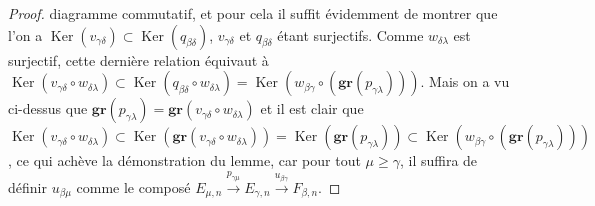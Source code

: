 \begin{proof}
diagramme commutatif, et pour cela il suffit évidemment de montrer que l'on a
$\operatorname{Ker}(v_{\gamma\delta})\subset\operatorname{Ker}(q_{\beta\delta})$,
$v_{\gamma\delta}$ et $q_{\beta\delta}$ étant surjectifs. Comme
$w_{\delta\lambda}$ est surjectif, cette dernière relation équivaut à
$\operatorname{Ker}(v_{\gamma\delta}\circ w_{\delta\lambda})\subset\operatorname{Ker}(q_{\beta\delta}\circ w_{\delta\lambda})=\operatorname{Ker}(w_{\beta\gamma}\circ(\mathbf{gr}(p_{\gamma\lambda})))$.
Mais on a vu ci-dessus que
$\mathbf{gr}(p_{\gamma\lambda})=\mathbf{gr}(v_{\gamma\delta}\circ w_{\delta\lambda})$ et il
est clair que
$\operatorname{Ker}(v_{\gamma\delta}\circ w_{\delta\lambda})\subset\operatorname{Ker}(\mathbf{gr}(v_{\gamma\delta}\circ w_{\delta\lambda}))=\operatorname{Ker}(\mathbf{gr}(p_{\gamma\lambda}))\subset\operatorname{Ker}(w_{\beta\gamma}\circ(\mathbf{gr}(p_{\gamma\lambda})))$,
ce qui achève la démonstration du lemme, car pour tout $\mu\geq\gamma$, il
suffira de définir $u_{\beta\mu}$ comme le composé
$E_{\mu,n}\xrightarrow{p_{\gamma\mu}}E_{\gamma,n}\xrightarrow{u_{\beta\gamma}}F_{\beta,n}$.
\end{proof}

